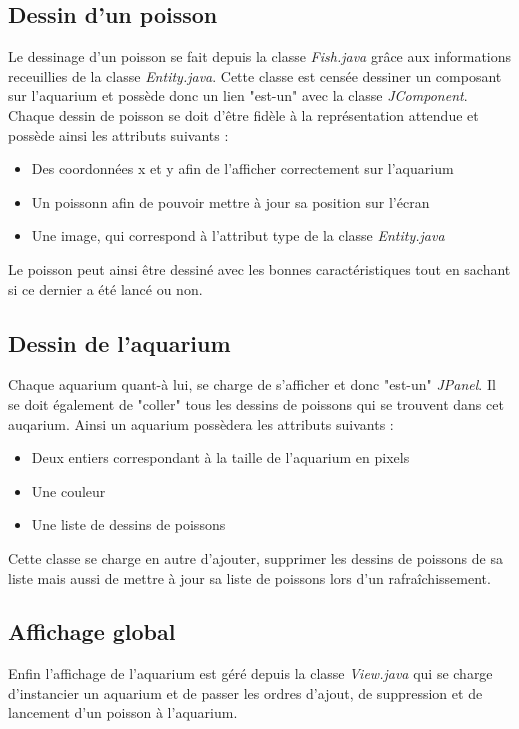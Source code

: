 \subsection{Dessin d'un poisson}
Le dessinage d'un poisson se fait depuis la classe \textit{Fish.java} grâce aux informations receuillies de la classe \textit{Entity.java}. Cette classe est censée dessiner un composant sur l'aquarium et possède donc un lien "est-un" avec la classe \textit{JComponent}. Chaque dessin de poisson se doit d'être fidèle à la représentation attendue et possède ainsi les attributs suivants :
\begin{itemize}
\item{Des coordonnées x et y afin de l'afficher correctement sur l'aquarium}
\item{Un poissonn afin de pouvoir mettre à jour sa position sur l'écran}
\item{Une image, qui correspond à l'attribut type de la classe \textit{Entity.java}}

\end{itemize}

Le poisson peut ainsi être dessiné avec les bonnes caractéristiques tout en sachant si ce dernier a été lancé ou non.

\subsection{Dessin de l'aquarium}

Chaque aquarium quant-à lui, se charge de s'afficher et donc "est-un" \textit{JPanel}. Il se doit également de "coller" tous les dessins de poissons qui se trouvent dans cet auqarium.
\newline Ainsi un aquarium possèdera les attributs suivants :
\begin{itemize}
\item{Deux entiers correspondant à la taille de l'aquarium en pixels}
\item{Une couleur}
\item{Une liste de dessins de poissons}
\end{itemize}

Cette classe se charge en autre d'ajouter, supprimer les dessins de poissons de sa liste mais aussi de mettre à jour sa liste de poissons lors d'un rafraîchissement.

\subsection{Affichage global}

Enfin l'affichage de l'aquarium est géré depuis la classe \textit{View.java} qui se charge d'instancier un aquarium et de passer les ordres d'ajout, de suppression et de lancement d'un poisson à l'aquarium.
